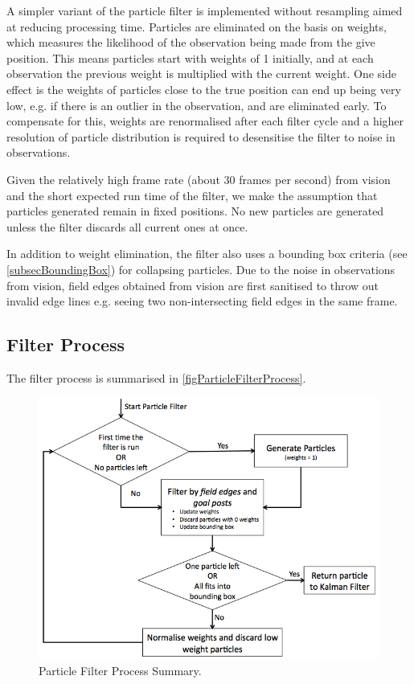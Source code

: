 \documentclass[pdftex,11pt,a4paper]{report}
\begin{document}
A simpler variant of the particle filter is implemented without resampling \cite{probablisticRobotics} aimed at reducing processing time. Particles are eliminated on the basis on weights, which measures the likelihood of the observation being made from the give position. This means particles start with weights of 1 initially, and at each observation the previous weight is multiplied with the current weight. One side effect is the weights of particles close to the true position can end up being very low, e.g. if there is an outlier in the observation, and are eliminated early. To compensate for this, weights are renormalised after each filter cycle and a higher resolution of particle distribution is required to desensitise the filter to noise in observations.

Given the relatively high frame rate (about 30 frames per second) from vision and the short expected run time of the filter, we make the assumption that particles generated remain in fixed positions. No new particles are generated unless the filter discards all current ones at once.

In addition to weight elimination, the filter also uses a bounding box criteria (see \autoref{subsecBoundingBox}) for collapsing particles. Due to the noise in observations from vision, field edges obtained from vision are first sanitised to throw out invalid edge lines e.g. seeing two non-intersecting field edges in the same frame. 

\subsection{Filter Process}
The filter process is summarised in \autoref{figParticleFilterProcess}.
\begin{figure} [ht]
\centering
\includegraphics[width=1.0\textwidth]{figures/ParticleFilterProcess.png}
\caption{Particle Filter Process Summary.} \label{figParticleFilterProcess}
\end{figure}
\end{document}
